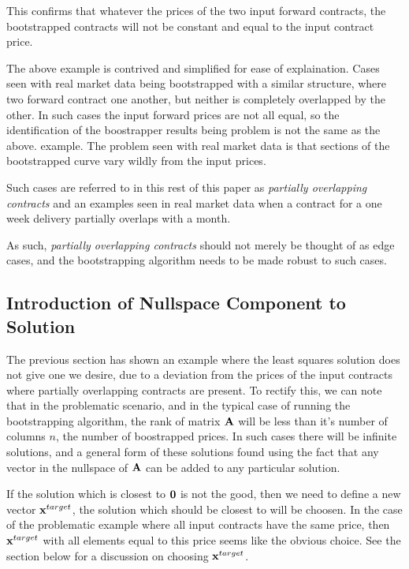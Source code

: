 \documentclass{article}
\begin{document}
This confirms that whatever the prices of the two input forward contracts, the bootstrapped
contracts will not be constant and equal to the input contract price.

\bigskip

The above example is contrived and simplified for ease of explaination.
Cases seen with real market data being bootstrapped with a similar structure, where
two forward contract one another, but neither is completely overlapped by the other.
In such cases the input forward prices are not all equal, so the identification
of the boostrapper results being problem is not the same as the above.
example. The problem seen with real market data is that sections of the bootstrapped
curve vary wildly from the input prices.

Such cases are referred to in this rest of this paper as \emph{partially overlapping contracts}
and an examples seen in real market data when a contract for a one week delivery partially
overlaps with a month.

As such, \emph{partially overlapping contracts} should not merely be 
thought of as edge cases, and the bootstrapping algorithm needs to be made robust to
such cases.


\subsection{Introduction of Nullspace Component to Solution}
The previous section has shown an example where the least squares solution does 
not give one we desire, due to a deviation from the prices of the input contracts
where partially overlapping contracts are present.
To rectify this, we can note that in the problematic scenario, and in the typical
case of running the bootstrapping algorithm, the rank of matrix $\mathbf{A}$ will be
less than it's number of columns $n$, the number of boostrapped prices. In such
cases there will be infinite solutions, and a general form of these solutions found
using the fact that any vector in the nullspace of $\mathbf{A}$ can be added to any
particular solution.

\bigskip

If the solution which is closest to $\mathbf{0}$ is not the good, then we need to define
a new vector $\mathbf{x}^{target}$, the solution which should be closest to will be choosen.
In the case of the problematic example where all input contracts have the same price,
then $\mathbf{x}^{target}$ with all elements equal to this price seems like the obvious choice.
See the section below for a discussion on choosing $\mathbf{x}^{target}$.
\end{document}
